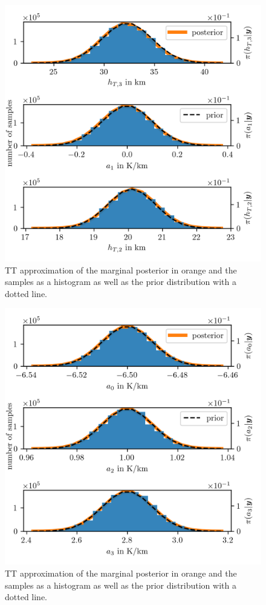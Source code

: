 \begin{figure}[ht!]
	\centering
	\includegraphics{PHdPTPost2.png}
	\caption[Histograms and TT approximation of posterior distribution as well as hyper-prior distribution.]{TT approximation of the marginal posterior in orange and the samples as a histogram as well as the prior distribution with a dotted line.}
	\label{fig:PostHistTT2}
\end{figure}
\begin{figure}[ht!]
	\centering
	\includegraphics{PHdPTPost3.png}
	\caption[Histograms and TT approximation of posterior distribution as well as hyper-prior distribution.]{TT approximation of the marginal posterior in orange and the samples as a histogram as well as the prior distribution with a dotted line.}
	\label{fig:PostHistTT3}
\end{figure}

